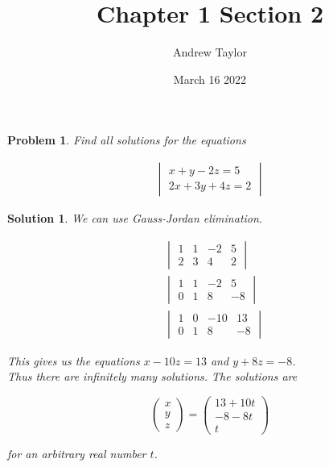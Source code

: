 \documentclass{article}
\title{Chapter 1 Section 2}
\author{Andrew Taylor}
\date{March 16 2022}
\newtheorem{problem}{Problem}
\newtheorem*{solution}{Solution}
\begin{document}
\maketitle

\begin{problem}
Find all solutions for the equations

\begin{align*}
\begin{vmatrix}
x + y - 2z = 5 \\
2x + 3y + 4z = 2
\end{vmatrix}
\end{align*}
\end{problem}

\begin{solution}

We can use Gauss-Jordan elimination.

\begin{align*}
&\begin{vmatrix}
1 & 1 & -2 & 5 \\ 
2 & 3 & 4 & 2 
\end{vmatrix} \\
&\begin{vmatrix}
1 & 1 & -2 & 5 \\ 
0 & 1 & 8 & -8 
\end{vmatrix} \\
&\begin{vmatrix}
1 & 0 & -10 & 13 \\ 
0 & 1 & 8 & -8 
\end{vmatrix}
\end{align*}

This gives us the equations $x - 10z = 13$ and $y + 8z = -8$. \\

Thus there are infinitely many solutions. The solutions are 

\begin{equation*}
\begin{pmatrix}x \\ y \\ z \end{pmatrix} = \begin{pmatrix}13 + 10t \\ -8 - 8t \\ t \end{pmatrix}
\end{equation*}

for an arbitrary real number $t$.

\end{solution}
\end{document}
